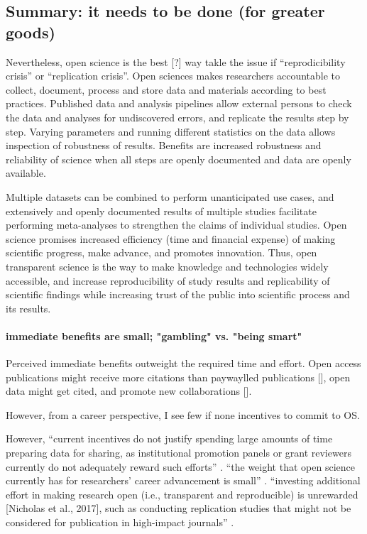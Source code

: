 \subsection{Summary: it needs to be done (for greater goods)}
%
Nevertheless, open science is the best [?] way takle the issue if
``reprodicibility crisis'' or ``replication crisis''.
%
Open sciences makes researchers accountable to collect, document, process and
store data and materials according to best practices.
%
Published data and analysis pipelines allow external persons to check the data
and analyses for undiscovered errors, and replicate the results step by step.
%
Varying parameters and running different statistics on the data allows
inspection of robustness of results.
%
Benefits are increased robustness and reliability of science when all steps are
openly documented and data are openly available.

%
Multiple datasets can be combined to perform unanticipated use cases, and
extensively and openly documented results of multiple studies facilitate
performing meta-analyses to strengthen the claims of individual studies.
%
Open science promises increased efficiency (time and financial expense) of
making scientific progress, make advance, and promotes innovation.
%
Thus, open transparent science is the way to make knowledge and technologies
widely accessible, and increase reproducibility of study results and
replicability of scientific findings while increasing trust of the public into
scientific process and its results.


\paragraph{immediate benefits are small; "gambling" vs. "being smart"}


Perceived immediate benefits outweight the required time and effort.
%
Open access publications might receive more citations than paywaylled
publications [\citep{piwowar2018state}], open data might
get cited, and promote new collaborations [\citep{popkin2019data}].


However, from a career perspective, I see few if none incentives to commit to
OS.

However, ``current incentives do not justify spending large amounts of time
preparing data for sharing, as institutional promotion panels or grant reviewers
currently do not adequately reward such efforts'' \citep{nichols2017best}.
%
``the weight that open science currently has for researchers' career advancement
is small'' \citep{toribio2021early}.
%
``investing additional effort in making research open (i.e., transparent and
reproducible) is unrewarded [Nicholas et al., 2017], such as conducting
replication studies that might not be considered for publication in high-impact
journals'' \citep{toribio2021early}.

